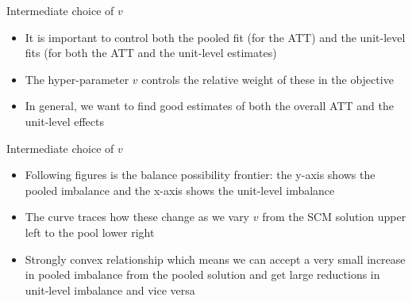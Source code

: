 \documentclass{beamer}
\begin{document}
\begin{frame}{Intermediate choice of $v$}

\begin{itemize}

\item It is important to control both the pooled fit (for the ATT) and the unit-level fits (for both the ATT and the unit-level estimates)
\item The hyper-parameter $v$ controls the relative weight of these in the objective
\item In general, we want to find good estimates of both the overall ATT and the unit-level effects

\end{itemize}

\end{frame}

\begin{frame}{Intermediate choice of $v$}

\begin{itemize}

\item Following figures is the balance possibility frontier: the y-axis shows the pooled imbalance and the x-axis shows the unit-level imbalance
\item The curve traces how these change as we vary $v$ from the SCM solution upper left to the pool lower right
\item Strongly convex relationship which means we can accept a very small increase in pooled imbalance from the pooled solution and get large reductions in unit-level imbalance and vice versa

\end{itemize}

\end{frame}





\end{document}
